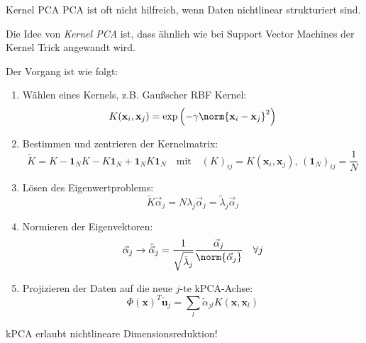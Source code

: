 \begin{defi}{Kernel PCA}
    PCA ist oft nicht hilfreich, wenn Daten nichtlinear strukturiert sind.

    Die Idee von \emph{Kernel PCA} ist, dass ähnlich wie bei Support Vector Machines der Kernel Trick angewandt wird.

    Der Vorgang ist wie folgt:
    \begin{enumerate}
        \item Wählen eines Kernels, z.B. Gaußscher RBF Kernel:
              \[
                  K(\mathbf{x}_i, \mathbf{x}_j) = \exp\left( -\gamma \norm{\mathbf{x}_i - \mathbf{x}_j}^2 \right)
              \]
        \item Bestimmen und zentrieren der Kernelmatrix:
              \[
                  \tilde{K} = K - \mathbf{1}_N K - K \mathbf{1}_N + \mathbf{1}_N K \mathbf{1}_N \quad \text{mit} \quad (K)_{ij} = K(\mathbf{x}_i, \mathbf{x}_j), \, (\mathbf{1}_N)_{ij} = \frac{1}{N}
              \]
        \item Lösen des Eigenwertproblems:
              \[
                  \tilde{K} \vec{\alpha}_j = N \lambda_j \vec{\alpha}_j = \tilde{\lambda}_j \vec{\alpha}_j
              \]
        \item Normieren der Eigenvektoren:
              \[
                  \vec{\alpha}_j \to \tilde{\vec{\alpha}}_j = \frac{1}{\sqrt{\tilde{\lambda}_j}} \frac{\vec{\alpha}_j}{\norm{\vec{\alpha}_j}} \quad \forall j
              \]
        \item Projizieren der Daten auf die neue $j$-te kPCA-Achse:
              \[
                  \Phi(\mathbf{x})^T \tilde{\mathbf{u}}_j = \sum_l \tilde{\alpha}_{jl} K(\mathbf{x}, \mathbf{x}_l)
              \]
    \end{enumerate}

    kPCA erlaubt nichtlineare Dimensionsreduktion!
\end{defi}


